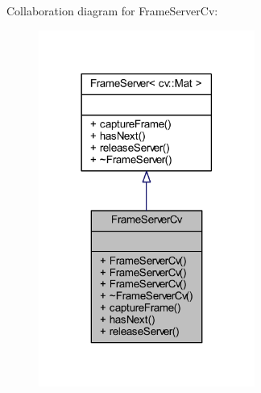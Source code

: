Collaboration diagram for Frame\+Server\+Cv\+:
\nopagebreak
\begin{figure}[H]
\begin{center}
\leavevmode
\includegraphics[width=201pt]{class_viscv_1_1_frame_server_cv__coll__graph}
\end{center}
\end{figure}
